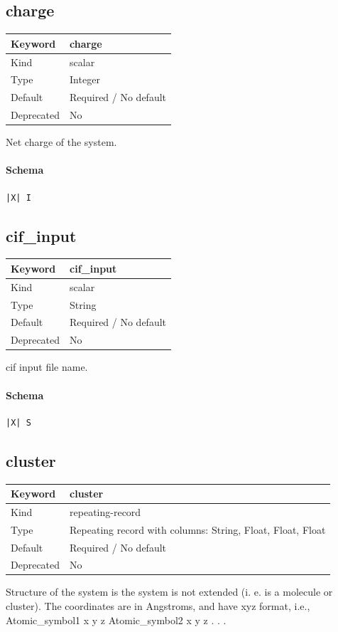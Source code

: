 \documentclass[11pt]{article}
\begin{document}
\subsection{charge}
\label{kw:charge}
\begin{longtable}{|p{1.5in}|p{4.5in}|}
\hline
Keyword & charge \\
\hline
Kind & scalar \\
\hline
Type & Integer \\
\hline
Default & Required / No default \\
\hline
Deprecated & No \\
\hline
\end{longtable}
 Net charge of the system.

\paragraph{Schema}
\begin{Verbatim}
|X| I
\end{Verbatim}

\subsection{cif\_input}
\label{kw:cif-input}
\begin{longtable}{|p{1.5in}|p{4.5in}|}
\hline
Keyword & cif\_input \\
\hline
Kind & scalar \\
\hline
Type & String \\
\hline
Default & Required / No default \\
\hline
Deprecated & No \\
\hline
\end{longtable}
 cif input file name.

\paragraph{Schema}
\begin{Verbatim}
|X| S
\end{Verbatim}

\subsection{cluster}
\label{kw:cluster}
\begin{longtable}{|p{1.5in}|p{4.5in}|}
\hline
Keyword & cluster \\
\hline
Kind & repeating-record \\
\hline
Type & Repeating record with columns: String, Float, Float, Float \\
\hline
Default & Required / No default \\
\hline
Deprecated & No \\
\hline
\end{longtable}
 Structure of the system is the system is not extended (i. e. is a molecule or
 cluster). The coordinates are in Angstroms, and have xyz format, i.e.,
 Atomic\_symbol1 x y z
 Atomic\_symbol2 x y z
 .
 .
 .
\end{document}
